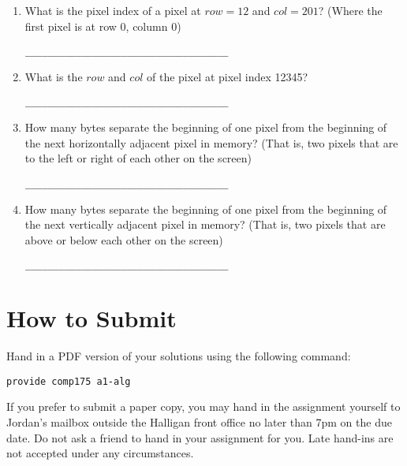 \documentclass[10pt,twocolumn]{article}
\begin{document}
\begin{framed}
\begin{enumerate}
\item What is the pixel index of a pixel at $row=12$ and $col=201$? (Where the first pixel is at row 0, column 0)
\begin{verbatim}____________________________________\end{verbatim}
\item What is the $row$ and $col$ of the pixel at pixel index 12345?
\begin{verbatim}____________________________________\end{verbatim}
\item How many bytes separate the beginning of one pixel from the beginning of the next horizontally adjacent pixel in memory? (That is, two pixels that are to the left or right of each other on the screen)
\begin{verbatim}____________________________________\end{verbatim}
\item How many bytes separate the beginning of one pixel from the beginning of the next vertically adjacent pixel in memory? (That is, two pixels that are above or below each other on the screen)
\begin{verbatim}____________________________________\end{verbatim}
\end{enumerate}
\end{framed}

\section{How to Submit}

Hand in a PDF version of your solutions using the following command:
\begin{center}
 {\tt provide comp175 a1-alg}
 \end{center}

If you prefer to submit a paper copy, you may hand in the assignment yourself to Jordan's mailbox outside the Halligan front office no later than 7pm on the due date. Do not ask a friend to hand in your assignment for you. Late hand-ins are not accepted under any circumstances.
\end{document}
